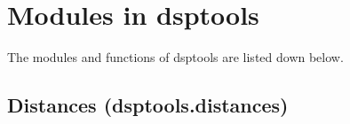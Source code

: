 \documentclass[letterpaper,10pt,english]{sphinxmanual}
\begin{document}
\sphinxstepscope


\chapter{Modules in dsptools}
\label{\detokenize{modules:modules-in-dsptools}}\label{\detokenize{modules::doc}}
\sphinxAtStartPar
The modules and functions of dsptools are listed down below.

\sphinxstepscope


\section{Distances (dsptools.distances)}
\label{\detokenize{modules/dsptools.distances:module-dsptools.distances}}\label{\detokenize{modules/dsptools.distances:distances-dsptools-distances}}\label{\detokenize{modules/dsptools.distances::doc}}
\end{document}
